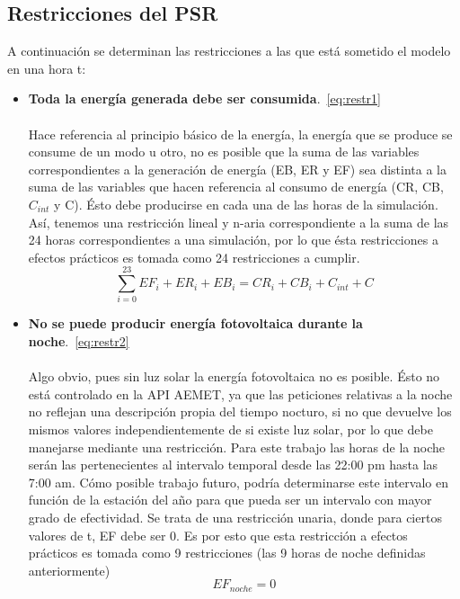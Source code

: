 \subsection{Restricciones del PSR}
A continuación se determinan las restricciones a las que está sometido el modelo en una hora t:
\begin{itemize}
\item \textbf{Toda la energía generada debe ser consumida}.~\ref{eq:restr1}\\ \\Hace referencia al principio básico de la energía, la energía que se produce se consume de un modo u otro, no es posible que la suma de las variables correspondientes a la generación de energía (EB, ER y EF) sea distinta a la suma de las variables que hacen referencia al consumo de energía (CR, CB, $ C_{int} $ y C). Ésto debe producirse en cada una de las horas de la simulación. Así, tenemos una restricción lineal y n-aria correspondiente a la suma de las 24 horas correspondientes a una simulación, por lo que ésta restricciones a efectos prácticos es tomada como 24 restricciones a cumplir.
\begin{equation}
        \label{eq:restr1}
        \sum_{i=0}^{23} EF_{i}+ER_{i}+EB_{i} = CR_{i}+CB_{i}+C_{int}+C
\end{equation}

\item \textbf{No se puede producir energía fotovoltaica durante la noche}.~\ref{eq:restr2}\\ \\Algo obvio, pues sin luz solar la energía fotovoltaica no es posible. Ésto no está controlado en la API AEMET, ya que las peticiones relativas a la noche no reflejan una descripción propia del tiempo nocturo, si no que devuelve los mismos valores independientemente de si existe luz solar, por lo que debe manejarse mediante una restricción. Para este trabajo las horas de la noche serán las pertenecientes al intervalo temporal desde las 22:00 pm hasta las 7:00 am. Cómo posible trabajo futuro, podría determinarse este intervalo en función de la estación del año para que pueda ser un intervalo con mayor grado de efectividad. Se trata de una restricción unaria, donde para ciertos valores de t, EF debe ser 0. Es por esto que esta restricción a efectos prácticos es tomada como 9 restricciones (las 9 horas de noche definidas anteriormente)
\begin{equation}
        \label{eq:restr2}
        EF_{noche} = 0
\end{equation}


\end{itemize}
